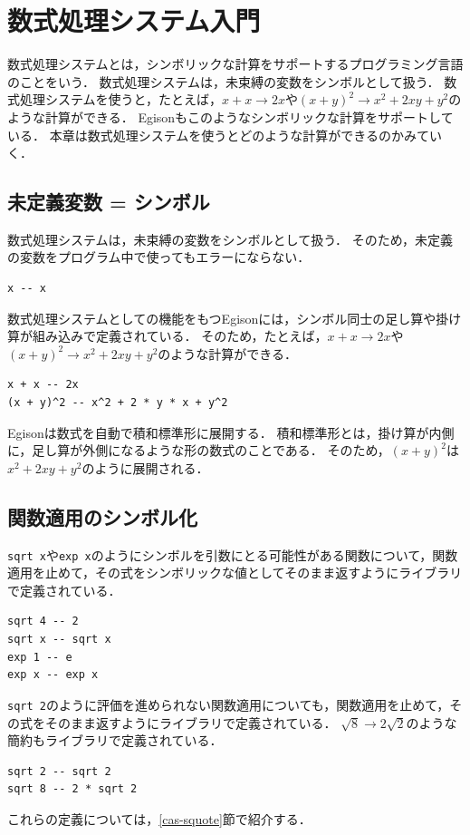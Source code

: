 \chapter{数式処理システム入門}\label{quick2}

数式処理システムとは，シンボリックな計算をサポートするプログラミング言語のことをいう．
数式処理システムは，未束縛の変数をシンボルとして扱う．
数式処理システムを使うと，たとえば，$x + x \rightarrow 2x$や$(x + y)^2 \rightarrow x^2 + 2 x y + y^2$のような計算ができる．
Egisonもこのようなシンボリックな計算をサポートしている．
本章は数式処理システムを使うとどのような計算ができるのかみていく．

\section{未定義変数 = シンボル}\label{quick2-symbol}

数式処理システムは，未束縛の変数をシンボルとして扱う．
そのため，未定義の変数をプログラム中で使ってもエラーにならない．
\begin{lstlisting}[language=egison,numbers=none]
x -- x
\end{lstlisting}

数式処理システムとしての機能をもつEgisonには，シンボル同士の足し算や掛け算が組み込みで定義されている．
そのため，たとえば，$x + x \rightarrow 2x$や$(x + y)^2 \rightarrow x^2 + 2 x y + y^2$のような計算ができる．
\begin{lstlisting}[language=egison,numbers=none]
x + x -- 2x
(x + y)^2 -- x^2 + 2 * y * x + y^2
\end{lstlisting}

Egisonは数式を自動で積和標準形に展開する．
積和標準形とは，掛け算が内側に，足し算が外側になるような形の数式のことである．
そのため，$(x + y)^2$は$x^2 + 2 x y + y^2$のように展開される．

\section{関数適用のシンボル化}\label{quick2-symbol2}

\lstinline{sqrt x}や\lstinline{exp x}のようにシンボルを引数にとる可能性がある関数について，関数適用を止めて，その式をシンボリックな値としてそのまま返すようにライブラリで定義されている．
\begin{lstlisting}[language=egison,numbers=none]
sqrt 4 -- 2
sqrt x -- sqrt x
exp 1 -- e
exp x -- exp x
\end{lstlisting}

\lstinline{sqrt 2}のように評価を進められない関数適用についても，関数適用を止めて，その式をそのまま返すようにライブラリで定義されている．
$\sqrt{8} \rightarrow 2 \sqrt{2}$のような簡約もライブラリで定義されている．
\begin{lstlisting}[language=egison,numbers=none]
sqrt 2 -- sqrt 2
sqrt 8 -- 2 * sqrt 2
\end{lstlisting}
これらの定義については，\ref{cas-squote}節\todo{}で紹介する．


